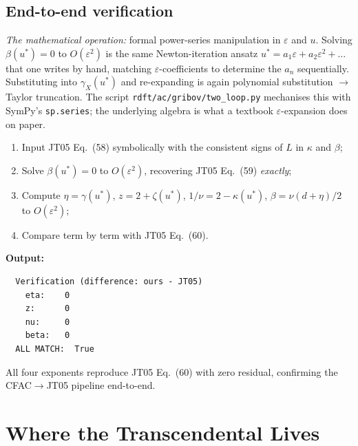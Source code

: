 \documentclass[11pt,a4paper]{article}
\theoremstyle{definition}
\theoremstyle{plain}
\begin{document}
\subsection{End-to-end verification}\label{sec:verification}

\begin{codebox}
\emph{The mathematical operation:} formal power-series manipulation
in $\varepsilon$ and $u$.  Solving $\beta(u^*) = 0$ to
$O(\varepsilon^2)$ is the same Newton-iteration ansatz $u^* = a_1
\varepsilon + a_2 \varepsilon^2 + \ldots$ that one writes by hand,
matching $\varepsilon$-coefficients to determine the $a_n$
sequentially.  Substituting into $\gamma_X(u^*)$ and re-expanding is
again polynomial substitution $\to$ Taylor truncation.  The script
\texttt{rdft/ac/gribov/two\_loop.py} mechanises this with SymPy's
\texttt{sp.series}; the underlying algebra is what a textbook
$\varepsilon$-expansion does on paper.
\begin{enumerate}[leftmargin=2em,label=(\arabic*)]
  \item Input JT05 Eq.~(58) symbolically with the consistent signs
    of $L$ in $\kappa$ and $\beta$;
  \item Solve $\beta(u^*) = 0$ to $O(\varepsilon^2)$, recovering JT05
    Eq.~(59) \emph{exactly};
  \item Compute $\eta = \gamma(u^*)$, $z = 2 + \zeta(u^*)$,
    $1/\nu = 2 - \kappa(u^*)$, $\beta = \nu(d+\eta)/2$ to $O(\varepsilon^2)$;
  \item Compare term by term with JT05 Eq.~(60).
\end{enumerate}
\textbf{Output:}
\begin{verbatim}
  Verification (difference: ours - JT05)
    eta:    0
    z:      0
    nu:     0
    beta:   0
  ALL MATCH:  True
\end{verbatim}
All four exponents reproduce JT05 Eq.~(60) with zero residual, confirming
the CFAC$\to$JT05 pipeline end-to-end.
\end{codebox}

\section{Where the Transcendental Lives}
\label{sec:transcendental}
\end{document}
